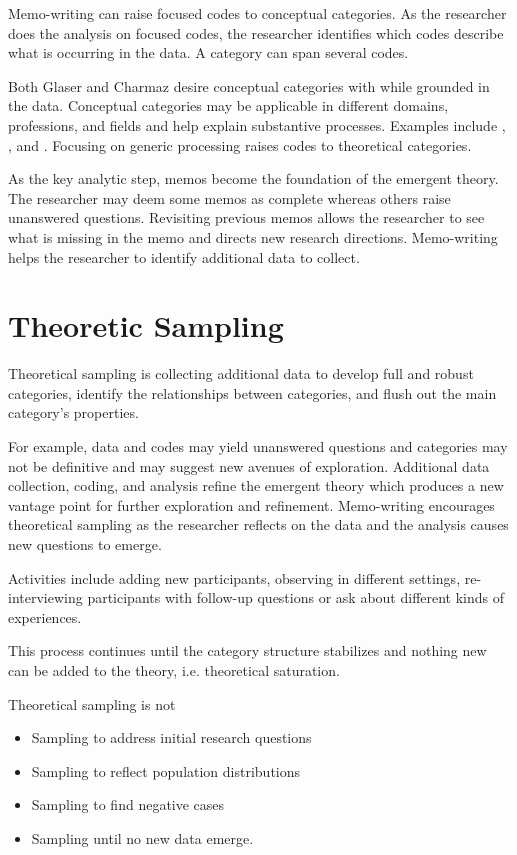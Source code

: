 Memo-writing can raise focused codes to conceptual categories. As the researcher does the analysis on focused codes, the researcher identifies which codes describe what is occurring in the data. A category can span several codes. 

Both Glaser and Charmaz desire conceptual categories with  \cite{Charmaz} while grounded in the data. Conceptual categories may be applicable in different domains, professions, and fields and help explain substantive processes. Examples include  \cite{KarabanowGettingOffTheStreet},  \cite{RiveraManagingSpoiledNationalIdentity}, and . Focusing on generic processing raises codes to theoretical categories. 

As the key analytic step, memos become the foundation of the emergent theory.  The researcher may deem some memos as complete whereas others raise unanswered questions. Revisiting previous memos allows the researcher to see what is missing in the memo and directs new research directions. Memo-writing helps the researcher to identify additional data to collect. 

\section{Theoretic Sampling}
Theoretical sampling is collecting additional data to develop full and robust categories, identify the relationships between categories, and flush out the main category's properties. 

For example, data and codes may yield unanswered questions and categories may not be definitive and may suggest new avenues of exploration. Additional data collection, coding, and analysis refine the emergent theory which produces a new vantage point for further exploration and refinement. Memo-writing encourages theoretical sampling as the researcher reflects on the data and the analysis causes new questions to emerge. 

Activities include adding new participants, observing in different settings, re-interviewing participants with follow-up questions or ask about different kinds of experiences.

This process continues until the category structure stabilizes and nothing new can be added to the theory, i.e. theoretical saturation. 

Theoretical sampling is not 
\begin{itemize}
\item Sampling to address initial research questions 
\item Sampling to reflect population distributions
\item Sampling to find negative cases
\item Sampling until no new data emerge. \cite{Charmaz}
\end{itemize}

